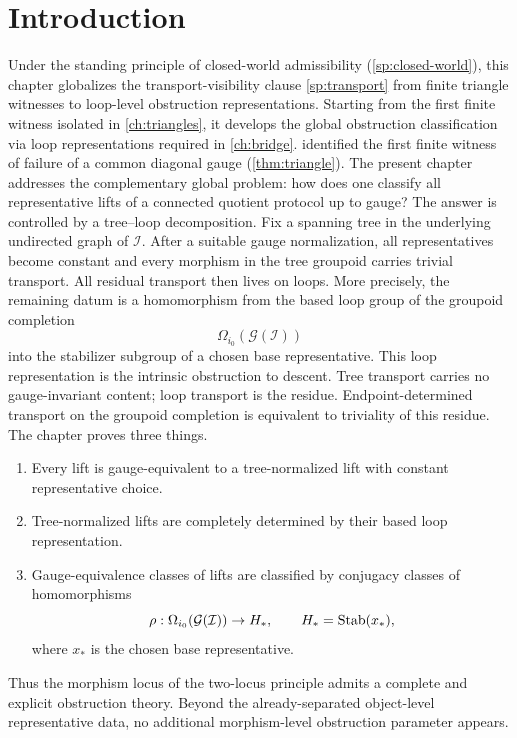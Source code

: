 \section{Introduction}
Under the standing principle of closed-world admissibility
(\cref{sp:closed-world}), this chapter globalizes the transport-visibility
clause \cref{sp:transport} from finite triangle witnesses to loop-level
obstruction representations.
Starting from the first finite witness isolated in \cref{ch:triangles},
it develops the global obstruction classification via loop
representations required in \cref{ch:bridge}.
 identified the first finite witness of failure of a
common diagonal gauge (\cref{thm:triangle}). The present chapter addresses the complementary
global problem: how does one classify all representative lifts of a
connected quotient protocol up to gauge?
The answer is controlled by a tree--loop decomposition.
Fix a spanning tree in the underlying undirected graph of
\(\mathcal I\). After a suitable gauge
normalization, all representatives become constant and every morphism in
the tree groupoid carries trivial transport. All residual transport then
lives on loops. More precisely, the remaining datum is a homomorphism
from the based loop group of the groupoid completion
\[
	\Omega_{i_0}(\mathcal G(\mathcal I))
\]
into the stabilizer subgroup of a chosen base representative.
This loop representation is the intrinsic obstruction to descent.
Tree transport carries no gauge-invariant content; loop transport is the
residue. Endpoint-determined transport on the groupoid completion is
equivalent to triviality of this residue.
The chapter proves three things.
\begin{enumerate}
	\item Every lift is gauge-equivalent to a tree-normalized lift with
	      constant representative choice.
	\item Tree-normalized lifts are completely determined by their based loop
	      representation.
	\item Gauge-equivalence classes of lifts are classified by conjugacy
	      classes of homomorphisms
	      \[
		      \rho:\Omega_{i_0}(\mathcal G(\mathcal I))\to H_*,
		      \qquad
		      H_*=\operatorname{Stab}(x_*),
	      \]
	      where \(x_*\) is the chosen base representative.
\end{enumerate}
Thus the morphism locus of the two-locus principle admits a complete
and explicit obstruction theory. Beyond the already-separated
object-level representative data, no additional morphism-level
obstruction parameter appears.
